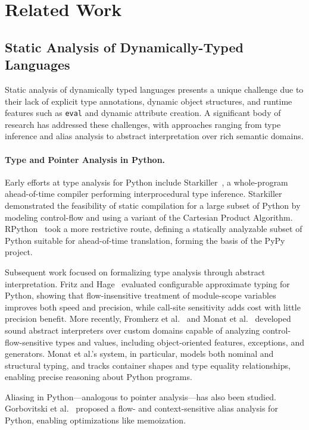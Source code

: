 \section{Related Work}
\subsection{Static Analysis of Dynamically-Typed Languages}
Static analysis of dynamically typed languages presents a unique challenge due to their lack of explicit type annotations, dynamic object structures, and runtime features such as \texttt{eval} and dynamic attribute creation. A significant body of research has addressed these challenges, with approaches ranging from type inference and alias analysis to abstract interpretation over rich semantic domains.

\paragraph{Type and Pointer Analysis in Python.}
Early efforts at type analysis for Python include Starkiller~\cite{salib2004starkiller}, a whole-program ahead-of-time compiler performing interprocedural type inference. Starkiller demonstrated the feasibility of static compilation for a large subset of Python by modeling control-flow and using a variant of the Cartesian Product Algorithm. RPython~\cite{ancona2007rpython} took a more restrictive route, defining a statically analyzable subset of Python suitable for ahead-of-time translation, forming the basis of the PyPy project.

Subsequent work focused on formalizing type analysis through abstract interpretation. Fritz and Hage~\cite{fritz2017cost} evaluated configurable approximate typing for Python, showing that flow-insensitive treatment of module-scope variables improves both speed and precision, while call-site sensitivity adds cost with little precision benefit.
More recently, Fromherz et al.~\cite{fromherz2018static} and Monat et al.~\cite{monat2021static} developed sound abstract interpreters over custom domains capable of analyzing control-flow-sensitive types and values, including object-oriented features, exceptions, and generators. Monat et al.'s system, in particular, models both nominal and structural typing, and tracks container shapes and type equality relationships, enabling precise reasoning about Python programs.

Aliasing in Python---analogous to pointer analysis---has also been studied. Gorbovitski et al.~\cite{gorbovitski2010alias} proposed a flow- and context-sensitive alias analysis for Python, enabling optimizations like memoization.

